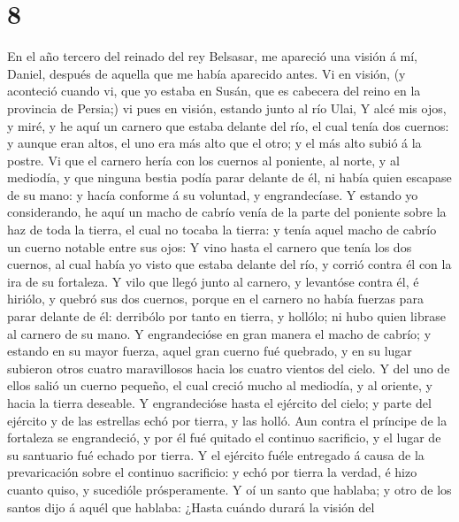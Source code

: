 \hypertarget{section-7}{%
\section{8}\label{section-7}}

 En el año tercero del reinado del rey Belsasar, me
apareció una visión á mí, Daniel, después de aquella que me había
aparecido antes.  Vi en visión, (y aconteció cuando vi,
que yo estaba en Susán, que es cabecera del reino en la provincia de
Persia;) vi pues en visión, estando junto al río Ulai,  Y
alcé mis ojos, y miré, y he aquí un carnero que estaba delante del río,
el cual tenía dos cuernos: y aunque eran altos, el uno era más alto que
el otro; y el más alto subió á la postre.  Vi que el
carnero hería con los cuernos al poniente, al norte, y al mediodía, y
que ninguna bestia podía parar delante de él, ni había quien escapase de
su mano: y hacía conforme á su voluntad, y engrandecíase. 
Y estando yo considerando, he aquí un macho de cabrío venía de la parte
del poniente sobre la haz de toda la tierra, el cual no tocaba la
tierra: y tenía aquel macho de cabrío un cuerno notable entre sus ojos:
 Y vino hasta el carnero que tenía los dos cuernos, al
cual había yo visto que estaba delante del río, y corrió contra él con
la ira de su fortaleza.  Y vilo que llegó junto al
carnero, y levantóse contra él, é hiriólo, y quebró sus dos cuernos,
porque en el carnero no había fuerzas para parar delante de él:
derribólo por tanto en tierra, y hollólo; ni hubo quien librase al
carnero de su mano.  Y engrandecióse en gran manera el
macho de cabrío; y estando en su mayor fuerza, aquel gran cuerno fué
quebrado, y en su lugar subieron otros cuatro maravillosos hacia los
cuatro vientos del cielo.  Y del uno de ellos salió un
cuerno pequeño, el cual creció mucho al mediodía, y al oriente, y hacia
la tierra deseable.  Y engrandecióse hasta el ejército
del cielo; y parte del ejército y de las estrellas echó por tierra, y
las holló.  Aun contra el príncipe de la fortaleza se
engrandeció, y por él fué quitado el continuo sacrificio, y el lugar de
su santuario fué echado por tierra.  Y el ejército fuéle
entregado á causa de la prevaricación sobre el continuo sacrificio: y
echó por tierra la verdad, é hizo cuanto quiso, y sucedióle
prósperamente.  Y oí un santo que hablaba; y otro de los
santos dijo á aquél que hablaba: ¿Hasta cuándo durará la visión del
